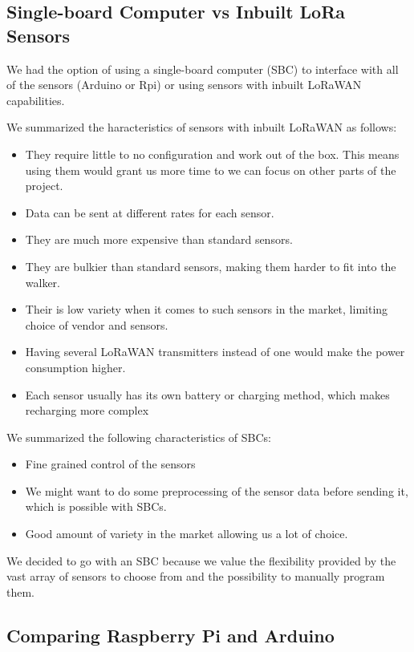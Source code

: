 	\subsection{Single-board Computer vs Inbuilt LoRa Sensors}

		We had the option of using a single-board computer (SBC) to interface with all of the sensors (Arduino or Rpi) or using sensors with inbuilt LoRaWAN capabilities.

		We summarized the haracteristics of sensors with inbuilt LoRaWAN as follows:
		\begin{itemize}
			\item They require little to no configuration and work out of the box. This means using them would grant us more time to we can focus on other parts of the project.
			\item Data can be sent at different rates for each sensor.
			\item They are much more expensive than standard sensors.
			\item They are bulkier than standard sensors, making them harder to fit into the walker.
			\item Their is low variety when it comes to such sensors in the market, limiting choice of vendor and sensors.
			\item Having several LoRaWAN transmitters instead of one would make the power consumption higher.
			\item Each sensor usually has its own battery or charging method, which makes recharging more complex
		\end{itemize}


		We summarized the following characteristics of SBCs:
		\begin{itemize}
			\item Fine grained control of the sensors
			\item We might want to do some preprocessing of the sensor data before sending it, which is possible with SBCs.
			\item Good amount of variety in the market allowing us a lot of choice.
		\end{itemize}

		We decided to go with an SBC because we value the flexibility provided by the vast array of sensors to choose from and the possibility to manually program them.



	\subsection{Comparing Raspberry Pi and Arduino}

